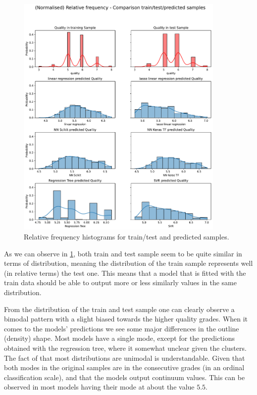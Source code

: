 \documentclass[11pt]{article}
\begin{document}
\begin{figure}[h!]
    \centering
    \includegraphics[width=0.9\textwidth]{figs/prediction_histograms}
    \caption{Relative frequency histograms for train/test and predicted samples.}
    \label{fig:prediction_hists}
\end{figure}

As we can observe in \cref{fig:prediction_hists}, both train and test sample seem to be quite similar in terms
of distribution, meaning the distribution of the train sample represents well (in relative terms) the test one.
This means that a model that is fitted with the train data should be able to output more or less similarly values
in the same distribution.

From the distribution of the train and test sample one can clearly observe a bimodal pattern with a slight
biased towards the higher quality grades.
When it comes to the models' predictions we see some major differences in the outline (density) shape.
Most models have a single mode, except for the predictions obtained with the regression tree, where it somewhat
unclear given the clusters.
The fact of that most distributions are unimodal is understandable.
Given that both modes in the original samples are in the consecutive grades (in an ordinal classification scale), and
that the models output continuum values.
This can be observed in most models having their mode at about the value $5.5$.
\end{document}
